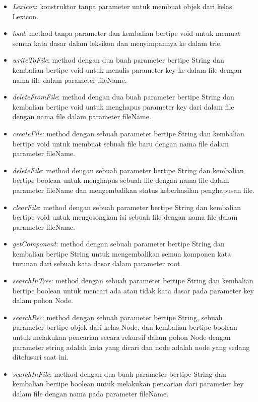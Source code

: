 \begin{itemize}
	\item \textit{Lexicon}: konstruktor tanpa parameter untuk membuat objek dari kelas Lexicon.
	\item \textit{load}: method tanpa parameter dan kembalian bertipe void untuk memuat semua kata dasar dalam leksikon dan menyimpannya ke dalam trie.
	\item \textit{writeToFile}: method dengan dua buah parameter bertipe String dan kembalian bertipe void untuk menulis parameter key ke dalam file dengan nama file dalam parameter fileName.
	\item \textit{deleteFromFile}: method dengan dua buah parameter bertipe String dan kembalian bertipe void untuk menghapus parameter key dari dalam file dengan nama file dalam parameter fileName.
	\item \textit{createFile}: method dengan sebuah parameter bertipe String dan kembalian bertipe void untuk membuat sebuah file baru dengan nama file dalam parameter fileName.
	\item \textit{deleteFile}: method dengan sebuah parameter bertipe String dan kembalian bertipe boolean untuk menghapus sebuah file dengan nama file dalam parameter fileName dan mengembalikan status keberhasilan penghapusan file.
	\item \textit{clearFile}: method dengan sebuah parameter bertipe String dan kembalian bertipe void untuk mengosongkan isi sebuah file dengan nama file dalam parameter fileName.
	\item \textit{getComponent}: method dengan sebuah parameter bertipe String dan kembalian bertipe String untuk mengembalikan semua komponen kata turunan dari sebuah kata dasar dalam parameter root.
	\item \textit{searchInTree}: method dengan sebuah parameter bertipe String dan kembalian bertipe boolean untuk mencari ada atau tidak kata dasar pada parameter key dalam pohon Node.
	\item \textit{searchRec}: method dengan sebuah parameter bertipe String, sebuah parameter bertipe objek dari kelas Node, dan kembalian bertipe boolean untuk melakukan pencarian secara rekursif dalam pohon Node dengan parameter string adalah kata yang dicari dan node adalah node yang sedang ditelusuri saat ini.
	\item \textit{searchInFile}: method dengan dua buah parameter bertipe String dan kembalian bertipe boolean untuk melakukan pencarian dari parameter key dalam file dengan nama pada parameter fileName.

\end{itemize}
